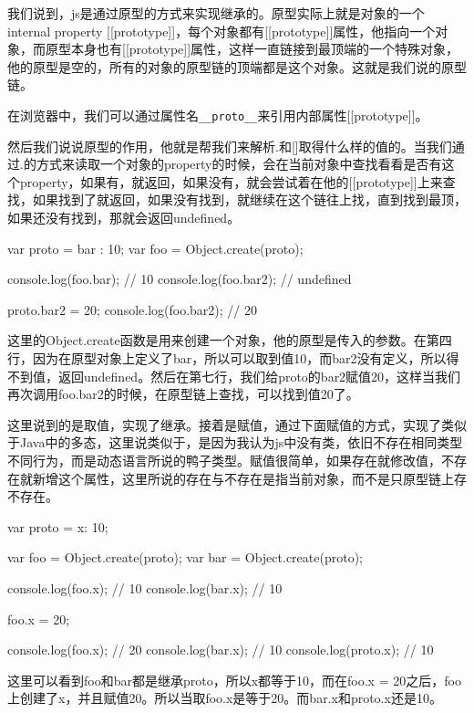 我们说到，js是通过原型的方式来实现继承的。原型实际上就是对象的一个internal property [[prototype]]，每个对象都有[[prototype]]属性，他指向一个对象，而原型本身也有[[prototype]]属性，这样一直链接到最顶端的一个特殊对象，他的原型是空的，所有的对象的原型链的顶端都是这个对象。这就是我们说的原型链。

在浏览器中，我们可以通过属性名\lstinline!__proto__!来引用内部属性[[prototype]]。
	
然后我们说说原型的作用，他就是帮我们来解析.和[]取得什么样的值的。当我们通过.的方式来读取一个对象的property的时候，会在当前对象中查找看看是否有这个property，如果有，就返回，如果没有，就会尝试着在他的[[prototype]]上来查找，如果找到了就返回，如果没有找到，就继续在这个链往上找，直到找到最顶，如果还没有找到，那就会返回undefined。
	
	
\begin{JavaScript}
var proto = {bar : 10};
var foo = Object.create(proto);

console.log(foo.bar); // 10
console.log(foo.bar2); // undefined

proto.bar2 = 20; 
console.log(foo.bar2); // 20
\end{JavaScript}
	
这里的Object.create函数是用来创建一个对象，他的原型是传入的参数。在第四行，因为在原型对象上定义了bar，所以可以取到值10，而bar2没有定义，所以得不到值，返回undefined。然后在第七行，我们给proto的bar2赋值20，这样当我们再次调用foo.bar2的时候，在原型链上查找，可以找到值20了。
	
	
这里说到的是取值，实现了继承。接着是赋值，通过下面赋值的方式，实现了类似于Java中的多态，这里说类似于，是因为我认为js中没有类，依旧不存在相同类型不同行为，而是动态语言所说的鸭子类型。赋值很简单，如果存在就修改值，不存在就新增这个属性，这里所说的存在与不存在是指当前对象，而不是只原型链上存不存在。
	
\begin{JavaScript}
var proto = {x: 10};

var foo = Object.create(proto);
var bar = Object.create(proto);

console.log(foo.x); // 10
console.log(bar.x); // 10

foo.x = 20;

console.log(foo.x); // 20
console.log(bar.x); // 10
console.log(proto.x); // 10
\end{JavaScript}
		
这里可以看到foo和bar都是继承proto，所以x都等于10，而在foo.x = 20之后，foo上创建了x，并且赋值20。所以当取foo.x是等于20。而bar.x和proto.x还是10。

